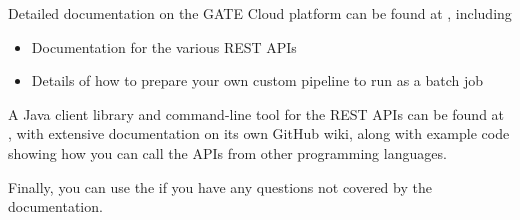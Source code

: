 \else %


Detailed documentation on the GATE Cloud platform can be found at
, including

\begin{itemize}
\item Documentation for the various REST APIs
\item Details of how to prepare your own custom pipeline to run as a batch job
\end{itemize}

A Java client library and command-line tool for the REST APIs can be found at
, with extensive
documentation on its own GitHub wiki, along with example code showing how you
can call the APIs from other programming languages.

Finally, you can use the  if you have any questions not covered by the documentation.

\fi %
